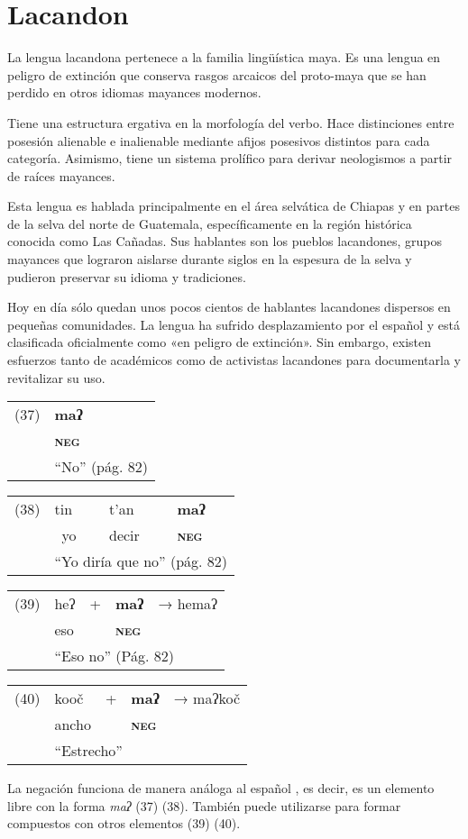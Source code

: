 \section*{Lacandon}

\noindent La lengua lacandona pertenece a la familia lingüística maya. Es una lengua en peligro de extinción que conserva rasgos arcaicos del proto-maya que se han perdido en otros idiomas mayances modernos.

 Tiene una estructura ergativa en la morfología del verbo. Hace distinciones entre posesión alienable e inalienable mediante afijos posesivos distintos para cada categoría. Asimismo, tiene un sistema prolífico para derivar neologismos a partir de raíces mayances.

Esta lengua es hablada principalmente en el área selvática de Chiapas y en partes de la selva del norte de Guatemala, específicamente en la región histórica conocida como Las Cañadas. Sus hablantes son los pueblos lacandones, grupos mayances que lograron aislarse durante siglos en la espesura de la selva y pudieron preservar su idioma y tradiciones.

Hoy en día sólo quedan unos pocos cientos de hablantes lacandones dispersos en pequeñas comunidades. La lengua ha sufrido desplazamiento por el español y está clasificada oficialmente como «en peligro de extinción». Sin embargo, existen esfuerzos tanto de académicos como de activistas lacandones para documentarla y revitalizar su uso. \vspace{0.5cm}

{\setmainfont{Charis SIL} 
\begin{tabular}{ll}
(37) & \textbf{maʔ}  \\
& \textsc{\textbf{neg}} \\
& ``No'' (pág. 82)
\end{tabular} \vspace{0.5cm}

\begin{tabular}{llll}
(38) & tin & t'an & \textbf{maʔ} \\
& \ yo & decir & \textsc{\textbf{neg}} \\
& \multicolumn{3}{l}{``Yo diría que no'' (pág. 82)}
\end{tabular} \vspace{0.5cm}

\begin{tabular}{lllll}
(39) & heʔ & + & \textbf{maʔ} & → hemaʔ \\
& eso & & \textsc{\textbf{neg}} & \\
& \multicolumn{4}{l}{``Eso no'' (Pág. 82)}
\end{tabular} \vspace{0.5cm}

\begin{tabular}{lllll}
(40) & kooč & + & \textbf{maʔ} & → maʔkoč \\
& ancho & & \textsc{\textbf{neg}} & \\
& \multicolumn{4}{l}{``Estrecho''}
\end{tabular} \vspace{0.5cm}
}

La negación funciona de manera análoga al español \textcolor{MidnightBlue}{\citep{lacandon}}, es decir, es un elemento libre con la forma {\setmainfont{Charis SIL} \textit{maʔ}} (37) (38). También puede utilizarse para formar compuestos con otros elementos (39) (40).